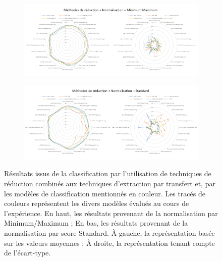 \begin{figure}[H]
    \centering
    
    \begin{subfigure}{\textwidth}
      \includegraphics[width=\textwidth]{contents/chapter_5/resources/results_image_classification_reduction_mms.pdf}
    \end{subfigure}
    
    \begin{subfigure}{\textwidth}
      \includegraphics[width=\textwidth]{contents/chapter_5/resources/results_image_classification_reduction_ss.pdf}
    \end{subfigure}
    
    \caption{Résultats issus de la classification par l'utilisation de techniques de réduction combinés aux techniques d'extraction par transfert et, par les modèles de classification mentionnés en couleur. Les tracés de couleurs représentent les divers modèles évalués au cours de l'expérience. En haut, les résultats provenant de la normalisation par Minimum/Maximum ; En bas, les résultats provenant de la normalisation par score Standard. À gauche, la représentation basée sur les valeurs moyennes ; À droite, la représentation tenant compte de l'écart-type.}
    \label{fig:results_image_classification_reduction}
\end{figure}\par

